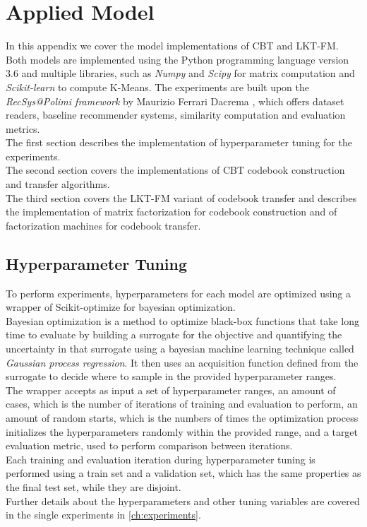 \chapter{Applied Model}
\label{ch:applied-model}

In this appendix we cover the model implementations of CBT and LKT-FM. Both models are implemented using the Python programming language version 3.6 and multiple libraries, such as \textit{Numpy} \cite{10.1109/MCSE.2011.37} and \textit{Scipy} \cite{scipy} for matrix computation and \textit{Scikit-learn} \cite{10.5555/1953048.2078195} to compute K-Means. The experiments are built upon the \textit{RecSys@Polimi framework} by Maurizio Ferrari Dacrema \cite{recsys-polimi-framework}, which offers dataset readers, baseline recommender systems, similarity computation and evaluation metrics.\\
The first section describes the implementation of hyperparameter tuning for the experiments.\\
The second section covers the implementations of CBT codebook construction and transfer algorithms.\\
The third section covers the LKT-FM variant of codebook transfer and describes the implementation of matrix factorization for codebook construction and of factorization machines for codebook transfer.



\section{Hyperparameter Tuning}

To perform experiments, hyperparameters for each model are optimized using a wrapper of Scikit-optimize \cite{10.5281/zenodo.1170575} for bayesian optimization.\\
Bayesian optimization \cite{bayesian-optimization} is a method to optimize black-box functions that take long time to evaluate by building a surrogate for the objective and quantifying the uncertainty in that surrogate using a bayesian machine learning technique called \textit{Gaussian process regression}. It then uses an acquisition function defined from the surrogate to decide where to sample in the provided hyperparameter ranges.\\
The wrapper accepts as input a set of hyperparameter ranges, an amount of cases, which is the number of iterations of training and evaluation to perform, an amount of random starts, which is the numbers of times the optimization process initializes the hyperparameters randomly within the provided range, and a target evaluation metric, used to perform comparison between iterations.\\
Each training and evaluation iteration during hyperparameter tuning is performed using a train set and a validation set, which has the same properties as the final test set, while they are disjoint.\\
Further details about the hyperparameters and other tuning variables are covered in the single experiments in \autoref{ch:experiments}.



